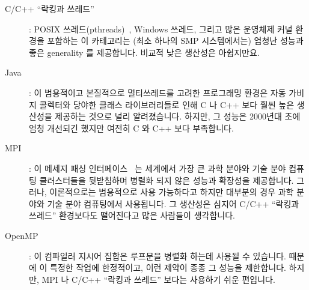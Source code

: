 \begin{description}
\item[C/C++ ``락킹과 쓰레드'']: POSIX
	쓰레드(pthreads)~\cite{OpenGroup1997pthreads}, Windows 쓰레드, 그리고
	많은 운영체제 커널 환경을 포함하는 이 카테고리는 (최소 하나의 SMP
	시스템에서는) 엄청난 성능과 좋은 generality 를 제공합니다.
	비교적 낮은 생산성은 아쉽지만요.
%

\item[Java]: 이 범용적이고 본질적으로 멀티쓰레드를 고려한 프로그래밍 환경은
	자동 가비지 콜렉터와 당야한 클래스 라이브러리들로 인해 C 나 C++ 보다
	훨씬 높은 생산성을 제공하는 것으로 널리 알려졌습니다.
	하지만, 그 성능은 2000년대 초에 엄청 개선되긴 했지만 여전히 C 와 C++
	보다 부족합니다.


\item[MPI]: 이 메세지 패싱 인터페이스~\cite{MPIForum2008} 는 세계에서 가장 큰
	과학 분야와 기술 분야 컴퓨팅 클러스터들을 뒷받침하며 병렬화 되지 않은
	성능과 확장성을 제공합니다.
	그러나, 이론적으로는 범용적으로 사용 가능하다고 하지만 대부분의 경우
	과학 분야와 기술 분야 컴퓨팅에서 사용됩니다.
	그 생산성은 심지어 C/C++ ``락킹과 쓰레드'' 환경보다도 떨어진다고 많은
	사람들이 생각합니다.


\item[OpenMP]: 이 컴파일러 지시어 집합은 루프문을 병렬화 하는데 사용될 수
	있습니다.
	때문에 이 특정한 작업에 한정적이고, 이런 제약이 종종 그 성능을
	제한합니다.
	하지만, MPI 나 C/C++ ``락킹과 쓰레드'' 보다는 사용하기 쉬운 편입니다.


\end{description}
